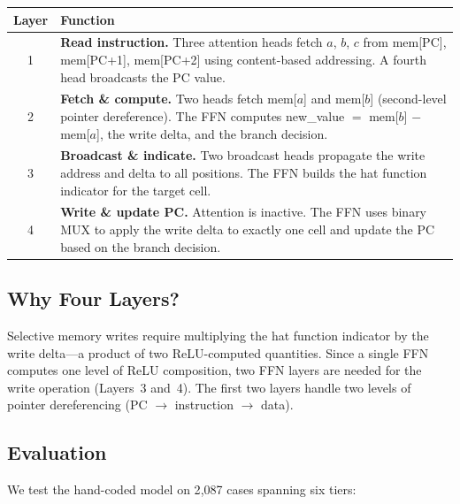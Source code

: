 \documentclass[11pt,a4paper]{article}
\begin{document}
\begin{center}
\begin{tabular}{cp{10cm}}
\toprule
\textbf{Layer} & \textbf{Function} \\
\midrule
1 & \textbf{Read instruction.} Three attention heads fetch $a$, $b$, $c$ from mem[PC], mem[PC+1], mem[PC+2] using content-based addressing. A fourth head broadcasts the PC value. \\
2 & \textbf{Fetch \& compute.} Two heads fetch mem[$a$] and mem[$b$] (second-level pointer dereference). The FFN computes new\_value $= $ mem[$b$] $-$ mem[$a$], the write delta, and the branch decision. \\
3 & \textbf{Broadcast \& indicate.} Two broadcast heads propagate the write address and delta to all positions. The FFN builds the hat function indicator for the target cell. \\
4 & \textbf{Write \& update PC.} Attention is inactive. The FFN uses binary MUX to apply the write delta to exactly one cell and update the PC based on the branch decision. \\
\bottomrule
\end{tabular}
\end{center}

\subsection{Why Four Layers?}

Selective memory writes require multiplying the hat function indicator by the write delta---a product of two ReLU-computed quantities.
Since a single FFN computes one level of ReLU composition, two FFN layers are needed for the write operation (Layers~3 and~4).
The first two layers handle two levels of pointer dereferencing (PC $\to$ instruction $\to$ data).

\subsection{Evaluation}

We test the hand-coded model on 2{,}087 cases spanning six tiers:
\end{document}
